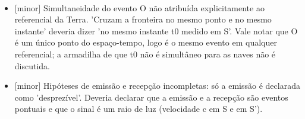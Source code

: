 \documentclass{article}%
\begin{document}
$$\begin{itemize}
\item%
{[}minor{]} Simultaneidade do evento O não atribuída explicitamente ao referencial da Terra. 'Cruzam a fronteira no mesmo ponto e no mesmo instante' deveria dizer 'no mesmo instante t0 medido em S'. Vale notar que O é um único ponto do espaço{-}tempo, logo é o mesmo evento em qualquer referencial; a armadilha de que t0 não é simultâneo para as naves não é discutida.%
\item%
{[}minor{]} Hipóteses de emissão e recepção incompletas: só a emissão é declarada como 'desprezível'. Deveria declarar que a emissão e a recepção são eventos pontuais e que o sinal é um raio de luz (velocidade c em S e em S').%
\end{itemize}%
\end{document}
